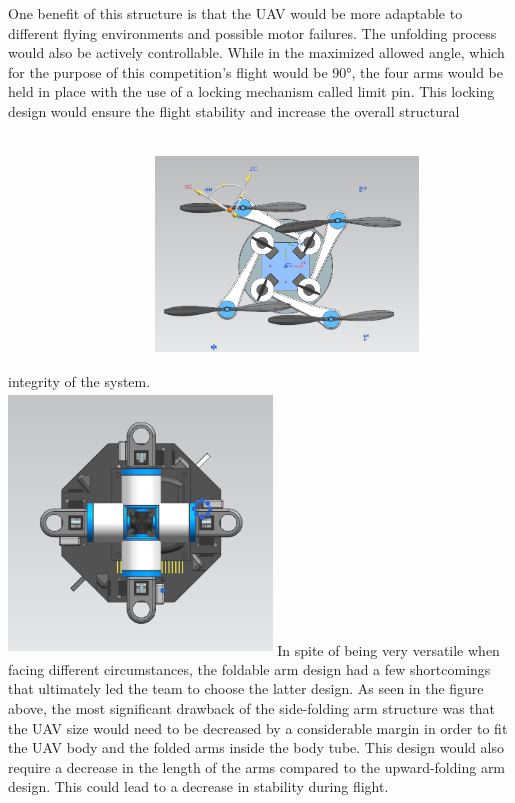 			One benefit of this structure is that the UAV would be more adaptable to different flying environments and possible motor failures. The unfolding process would also be actively controllable. While in the maximized allowed angle, which for the purpose of this competition’s flight would be 90°, the four arms would be held in place with the use of a locking mechanism called limit pin. This locking design would ensure the flight stability and increase the overall structural integrity of the system. 
			\includegraphics[width = 7cm, height = 7cm]{img/PL/topold.PNG}
			\includegraphics[width = 7cm, height = 7cm]{img/PL/topnew.PNG}
			In spite of being very versatile when facing different circumstances, the foldable arm design had a few shortcomings that ultimately led the team to choose the latter design. As seen in the figure above, the most significant drawback of the side-folding arm structure was that the UAV size would need to be decreased by a considerable margin in order to fit the UAV body and the folded arms inside the body tube. This design would also require a decrease in the length of the arms compared to the upward-folding arm design. This could lead to a decrease in stability during flight. 
		

